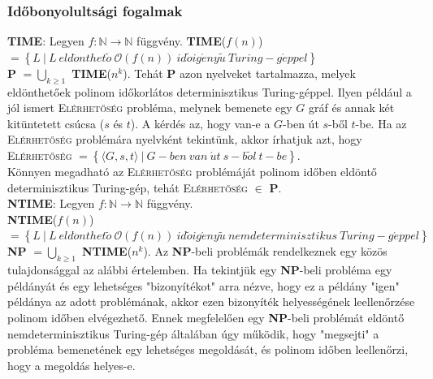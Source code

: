 \documentclass[margin=0px]{article}
\begin{document}
	\subsubsection{Időbonyolultsági fogalmak}
	
	\noindent \textbf{TIME}: Legyen $f : \mathbb{N} \to \mathbb{N}$ függvény. \textbf{TIME}($f(n)$) $= \left\{L \ | \ L \ eld\ddot{o}nthet\tilde{o} \ \mathcal{O}(f(n)) \ id\tilde{o}ig\acute{e}ny\tilde{u} \ Turing-g\acute{e}ppel \right\}$\\
	
	\noindent \textbf{P} $=\bigcup_{k \geq 1}$ \textbf{TIME}($n^{k}$). Tehát \textbf{P} azon nyelveket tartalmazza,
	melyek eldönthetőek polinom időkorlátos	determinisztikus Turing-géppel. Ilyen például a jól ismert \textsc{Elérhetőség}
	probléma, melynek bemenete egy $G$ gráf és annak két kitüntetett csúcsa ($s$ és $t$). A	kérdés az, hogy van-e a $G$-ben
	út $s$-ből $t$-be. Ha az \textsc{Elérhetőség} problémára nyelvként tekintünk, akkor írhatjuk azt, hogy\\
	
	\textsc{Elérhetőség} $= \left\{\langle G, s, t \rangle \ | \ G-ben \ van \ \acute{u}t \ s-b\tilde{o}l \ t-be\right\}$.\\
	
	Könnyen megadható az \textsc{Elérhetőség} problémáját polinom időben eldöntő determinisztikus Turing-gép, tehát
	\textsc{Elérhetőség} $\in$ \textbf{P}.\\
	
	\noindent \textbf{NTIME}: Legyen $f : \mathbb{N} \to \mathbb{N}$ függvény.\\ \textbf{NTIME}($f(n)$) $= \left\{L \ | \ L \ eld\ddot{o}nthet\tilde{o} \ \mathcal{O}(f(n)) \ id\tilde{o}ig\acute{e}ny\tilde{u} \ nemdeterminisztikus\ Turing-g\acute{e}ppel \right\}$\\
		
	\noindent \textbf{NP} $=\bigcup_{k \geq 1}$ \textbf{NTIME}($n^{k}$).
	Az \textbf{NP}-beli problémák rendelkeznek egy közös tulajdonsággal az alábbi értelemben.
	Ha tekintjük egy \textbf{NP}-beli probléma egy példányát és egy lehetséges "bizonyítékot"
	arra nézve, hogy ez a példány "igen" példánya az adott problémának,
	akkor ezen bizonyíték helyességének leellenőrzése polinom időben elvégezhető.
	Ennek megfelelően egy \textbf{NP}-beli problémát eldöntő nemdeterminisztikus Turing-gép
	általában úgy működik, hogy "megsejti" a probléma bemenetének egy lehetséges megoldását,
	és polinom időben leellenőrzi, hogy a megoldás helyes-e.
	
\end{document}
